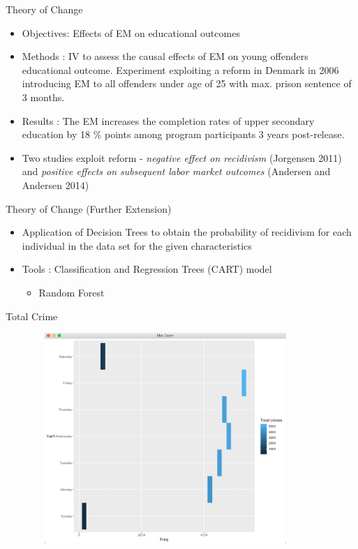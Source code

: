 \documentclass{beamer}
\begin{document}


\begin{frame}{Theory of Change}
    \begin{itemize}
       \item Objectives: Effects of EM on educational outcomes
       \item Methods : IV to assess the causal effects of EM on young offenders educational outcome. Experiment exploiting a reform in Denmark in 2006 introducing EM to all offenders under age of 25 with max. prison sentence of 3 months. 
       \item Results : The EM increases the completion rates of upper secondary education by 18 \% points among program participants 3 years post-release. 
       \item Two studies exploit reform - \textit{negative effect on recidivism} (Jorgensen 2011) and \textit{positive effects on subsequent labor market outcomes} (Andersen and Andersen 2014)
    \end{itemize}
\end{frame}
\begin{frame}{Theory of Change (Further Extension)}
    \begin{itemize}
        \item Application of Decision Trees to obtain the probability of recidivism  for each individual in the data set for the given characteristics 
        \item Tools : Classification and Regression Trees (CART) model
        \begin{itemize}
            \item Random Forest
        \end{itemize}
    
         \end{itemize}

\end{frame}
\begin{frame}{Total Crime}
  \begin{figure}        
\centering
\includegraphics[width=10cm, height = 8cm]{Total_crimes.JPEG}
\end{figure}
\end{frame}
\end{document}
